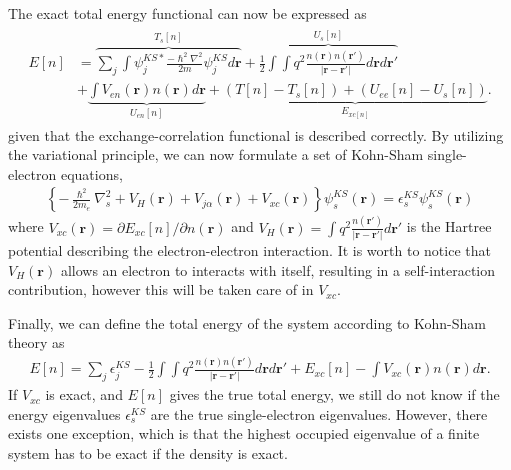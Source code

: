 The exact total energy functional can now be expressed as
\begin{align}
  \begin{aligned}
  E[n]
  &= \overbrace{\sum_j \int \psi_j^{KS*} \frac{-\hslash^2\nabla^2}{2m} \psi_j^{KS}d\boldsymbol{r}}^{T_s[n]} + \overbrace{\frac{1}{2}\int \int q^2\frac{n(\boldsymbol{r})n(\boldsymbol{r}')}{\lvert \boldsymbol{r}-\boldsymbol{r}'\rvert} d\boldsymbol{r}d\boldsymbol{r}'}^{U_s[n]}
  \\ &+ \underbrace{\int V_{en}(\boldsymbol{r})n(\boldsymbol{r})d\boldsymbol{r}}_{U_{en}[n]} + \underbrace{\left(T[n] - T_s[n] \right) + \left( U_{ee}[n] - U_s[n] \right)}_{E_{xc[n]}}.
  \end{aligned}
\end{align}
given that the exchange-correlation functional is described correctly. By utilizing the variational principle, we can now formulate a set of Kohn-Sham single-electron equations,
\begin{align}
  \left\{ -\frac{\hslash^2}{2m_e}\nabla^2_s + V_H(\boldsymbol{r}) + V_{j\alpha}(\boldsymbol{r}) + V_{xc}(\boldsymbol{r}) \right\} \psi_s^{KS}(\boldsymbol{r}) = \epsilon_s^{KS} \psi_s^{KS}(\boldsymbol{r})
  \label{eq:singleKS}
\end{align}
where $V_{xc}(\boldsymbol{r})=\partial E_{xc}[n]/\partial n(\boldsymbol{r})$ and $V_{H}(\boldsymbol{r})=\int q^2 \frac{n(\boldsymbol{r'})}{\lvert \boldsymbol{r} - \boldsymbol{r}'\rvert} d\boldsymbol{r}'$ is the Hartree potential describing the electron-electron interaction. It is worth to notice that $V_H(\boldsymbol{r})$ allows an electron to interacts with itself, resulting in a self-interaction contribution, however this will be taken care of in $V_{xc}$.

Finally, we can define the total energy of the system according to Kohn-Sham theory as
\begin{align}
  E[n] = \sum_{j}\epsilon_j^{KS}-\frac{1}{2}\int \int q^2 \frac{n(\boldsymbol{r})n(\boldsymbol{r}')}{\lvert \boldsymbol{r} - \boldsymbol{r}' \rvert} d\boldsymbol{r}d\boldsymbol{r}' + E_{xc}[n] - \int V_{xc}(\boldsymbol{r})n(\boldsymbol{r})d\boldsymbol{r}.
\end{align}
If $V_{xc}$ is exact, and $E[n]$ gives the true total energy, we still do not know if the energy eigenvalues $\epsilon_s^{KS}$ are the true single-electron eigenvalues. However, there exists one exception, which is that the highest occupied eigenvalue of a finite system has to be exact if the density is exact.

